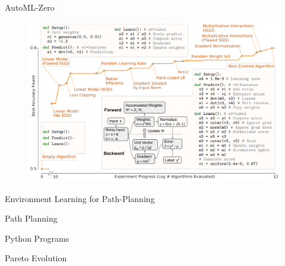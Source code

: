 \documentclass[aspectratio=169]{beamer}
\makeatletter
\newcommand{\white}[1]{{\color{pureminimalistic@text@white} #1}}
\newcommand{\cb}[1]{{\color{c2} #1}}
\newcommand{\cc}[1]{{\color{c3} #1}}
\newcommand{\ce}[1]{{\color{c4} #1}}
\makeatother
\begin{document}
\begin{frame}[plain]{AutoML-Zero \white{\cite{real2020automl}}}
    \begin{figure}
        \centering
        \includegraphics[scale=0.37]{figures/automl_zero_main_fig.png}
    \end{figure}
\end{frame}

\begin{frame}{Environment Learning for Path-Planning}
    \begin{vfilleditems}
        \item \cb{\Huge Path Planning}
        \vspace{0.7em}
        \item \cc{\Huge Python Programs}
        \vspace{0.7em}
        \item \ce{\Huge Pareto Evolution}
    \end{vfilleditems}
\end{frame}
\end{document}
